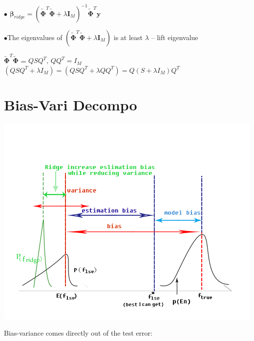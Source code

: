 \documentclass[10pt,a4paper,landscape]{article}
\newcommand{\bbeta}{\boldsymbol\beta}
\begin{document}
\begin{multicols*}{6}
$\bullet$ $\bbeta_{ridge} = ( \tilde{\boldsymbol\Phi}^T \tilde{\boldsymbol\Phi} + \lambda \boldsymbol I_M)^{-1} \tilde{\boldsymbol\Phi}^T \boldsymbol y$

$\bullet$The eigenvalues of $( \tilde{\boldsymbol\Phi}^T \tilde{\boldsymbol\Phi} + \lambda \boldsymbol I_M)$ is at least $\lambda$ -- lift eigenvalue 

$\tilde{\boldsymbol\Phi}^T \tilde{\boldsymbol\Phi}$ = $QSQ^T,\, QQ^T = I_M$ \\
$(QSQ^T + \lambda I_M) = (QSQ^T + \lambda QQ^T) = Q(S+\lambda I_M)Q^T$





\section{Bias-Vari Decompo}
\begin{colfig}
\centering
\includegraphics[width=\linewidth]{images/bias-variance2.png}
\end{colfig}

Bias-variance comes directly out of the test error:


\end{multicols*}
\end{document}
